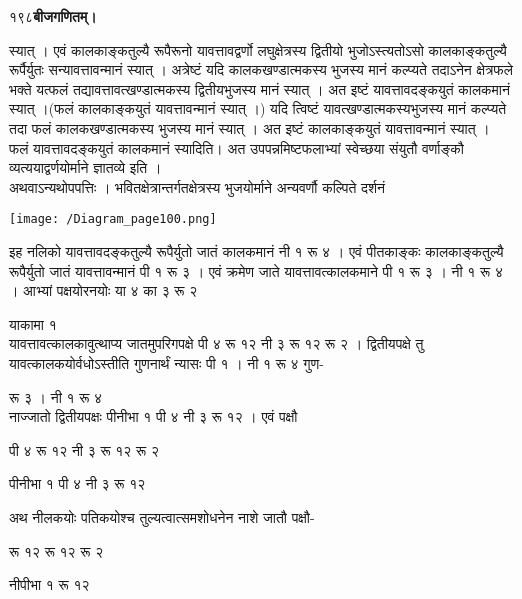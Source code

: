 \documentclass[11pt, openany]{book}
\begin{document}
\onehalfspacing
१९८\hspace{2in}\textbf{बीजगणितम्।} 

\vspace{5mm}

\begin{sloppypar}
\hangindent=0.2in स्यात् । एवं कालकाङ्कतुल्यै रूपैरूनो यावत्तावद्वर्णो लघुक्षेत्रस्य द्वितीयो भुजोऽस्त्यतोऽसो कालकाङ्कतुल्यै रूर्पैर्युतः सन्यावत्तावन्मानं स्यात् । अत्रेष्टं यदि कालकखण्डात्मकस्य भुजस्य मानं कल्प्यते तदाऽनेन क्षेत्रफले भक्ते यत्फलं तद्यावत्तावत्खण्डात्मकस्य द्वितीयभुजस्य मानं स्यात् । अत इष्टं यावत्तावदङ्कयुतं कालकमानं स्यात् ।(फलं कालकाङ्कयुतं यावत्तावन्मानं स्यात् ।) यदि त्विष्टं यावत्खण्डात्मकस्यभुजस्य मानं कल्प्यते तदा फलं कालकखण्डात्मकस्य भुजस्य मानं स्यात् । अत इष्टं कालकाङ्कयुतं यावत्तावन्मानं स्यात् । फलं यावत्तावदङ्कयुतं कालकमानं स्यादिति। अत उपपन्नमिष्टफलाभ्यां स्वेच्छया संयुतौ वर्णाङ्कौ व्यत्ययाद्वर्णयोर्माने ज्ञातव्ये इति ।\\ 

\hangindent=0.2in \hspace{0.2in}अथवाऽन्यथोपपत्तिः । भवितक्षेत्रान्तर्गतक्षेत्रस्य भुजयोर्माने अन्यवर्णौ कल्पिते दर्शनं \\

\begin{center}
\hspace{0.2in}\texttt{[image: /Diagram\_page100.png]}
\end{center}

\hangindent=0.2in \hspace{0.2in}इह नलिको यावत्तावदङ्कतुल्यै रूपैर्युतो जातं कालकमानं नी १ रू ४ । एवं पीतकाङ्कः कालकाङ्कतुल्यै रूपैर्युतो जातं यावत्तावन्मानं पी १ रू ३ । एवं क्रमेण जाते यावत्तावत्कालकमाने पी १ रू ३ । नी १ रू ४ । आभ्यां पक्षयोरनयोः या ४ का ३ रू २ 

\hspace{2.75in}याकामा १\\

\hangindent=0.2in यावत्तावत्कालकावुत्थाप्य जातमुपरिगपक्षे पी ४ रू १२ नी ३ रू १२ रू २ । द्वितीयपक्षे तु यावत्कालकयोर्वधोऽस्तीति गुणनार्थं न्यासः पी १ । नी १ रू ४ गुण- 

\hspace{2.6in}रू ३ । नी १ रू ४ \\

\hangindent=0.2in नाज्जातो द्वितीयपक्षः पीनीभा १ पी ४ नी ३ रू १२ । एवं पक्षौ 

\begin{center}
पी ४ रू १२ नी ३ रू १२ रू २ 

पीनीभा १ पी ४ नी ३ रू १२ 
\end{center}

\hangindent=0.2in अथ नीलकयोः पतिकयोश्च तुल्यत्वात्समशोधनेन नाशे जातौ पक्षौ- 

\begin{center}
रू १२ रू १२ रू २ 

नीपीभा १ रू १२
\end{center}
\end{sloppypar}
\thispagestyle{empty}
\newpage
\end{document}
